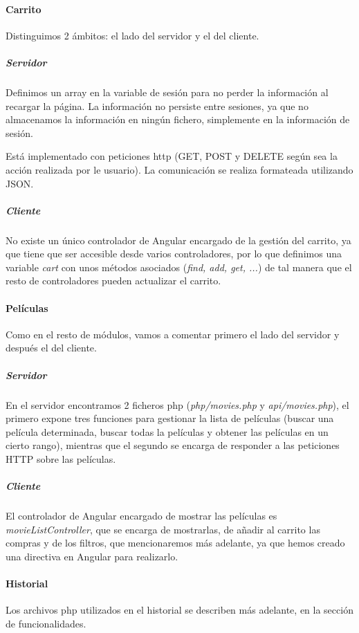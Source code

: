 \documentclass{apuntes}
\begin{document}
\label{CriterioPHP}

\paragraph{Carrito}

Distinguimos 2 ámbitos: el lado del servidor y el del cliente. \label{Carrito}

\subparagraph{Servidor}


Definimos un array en la variable de sesión para no perder la información al recargar la página. La información no persiste entre sesiones, ya que no almacenamos la información en ningún fichero, simplemente en la información de sesión.

Está implementado con peticiones http (GET, POST y DELETE según sea la acción realizada por le usuario). La comunicación se realiza formateada utilizando JSON.

\subparagraph{Cliente}

No existe un único controlador de Angular encargado de la gestión del carrito, ya que tiene que ser accesible desde varios controladores, por lo que definimos una variable \textit{cart} con unos métodos asociados (\textit{find, add, get, ...}) de tal manera que el resto de controladores pueden actualizar el carrito.

\paragraph{Películas}

Como en el resto de módulos, vamos a comentar primero el lado del servidor y después el del cliente.

\subparagraph{Servidor}
En el servidor encontramos 2 ficheros php (\textit{php/movies.php} y \textit{api/movies.php}), el primero expone tres funciones para gestionar la lista de películas (buscar una película determinada, buscar todas la películas y obtener las películas en un cierto rango), mientras que el segundo se encarga de responder a las peticiones HTTP sobre las películas.

\subparagraph{Cliente}
El controlador de Angular encargado de mostrar las películas es \textit{movieListController}, que se encarga de mostrarlas, de añadir al carrito las compras y de los filtros, que mencionaremos más adelante, ya que hemos creado una directiva en Angular para realizarlo.


\paragraph{Historial} Los archivos php utilizados en el historial se describen más adelante, en la sección de funcionalidades.
\end{document}
